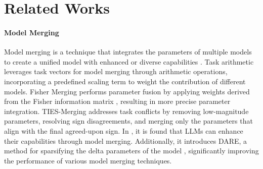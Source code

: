 \section{Related Works}
\paragraph{\textbf{{Model Merging}}}
Model merging is a technique that integrates the parameters of multiple models to create a unified model with enhanced or diverse capabilities \citep{wortsman2022model,ilharco2022editing,matena2022merging,jin2022dataless,yadav2023resolving,yu2024language,lin2024mitigating}. 
Task arithmetic \citep{ilharco2022editing} leverages task vectors for model merging through arithmetic operations, incorporating a predefined scaling term to weight the contribution of different models.
Fisher Merging \citep{matena2022merging} performs parameter fusion by applying weights derived from the Fisher information matrix \citep{fisher1922mathematical}, resulting in more precise parameter integration.
TIES-Merging \citep{yadav2023resolving} addresses task conflicts by removing low-magnitude parameters, resolving sign disagreements, and merging only the parameters that align with the final agreed-upon sign.
In \citep{yu2024language}, it is found that LLMs can enhance their capabilities through model merging. Additionally, it introduces DARE, a method for sparsifying the delta parameters of the model \citep{ilharco2022editing}, significantly improving the performance of various model merging techniques. 

